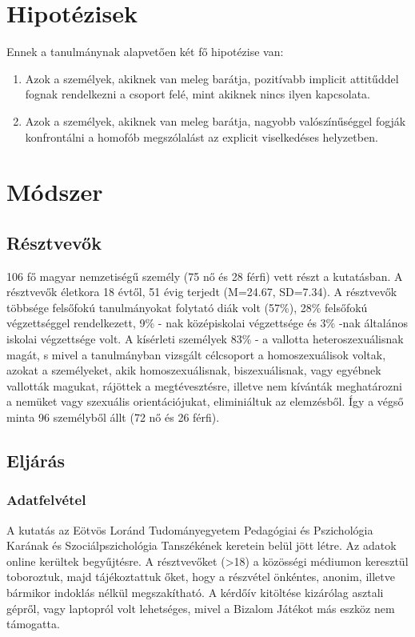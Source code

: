 \pagebreak
\section{Hipotézisek}
Ennek a tanulmánynak alapvetően két fő hipotézise van:
\begin{enumerate}
	\item Azok a személyek, akiknek van meleg barátja, pozitívabb implicit attitűddel fognak rendelkezni a csoport felé, mint akiknek nincs ilyen kapcsolata.
	\item Azok a személyek, akiknek van meleg barátja, nagyobb valószínűséggel fogják konfrontálni a homofób megszólalást az explicit viselkedéses helyzetben.
\end{enumerate}


\section{Módszer}
\subsection{Résztvevők}
106 fő magyar nemzetiségű személy (75 nő és 28 férfi) vett részt a kutatásban. A résztvevők életkora 18 évtől, 51 évig terjedt (M=24.67, SD=7.34). A résztvevők többsége felsőfokú tanulmányokat folytató diák volt (57\%), 28\% felsőfokú végzettséggel rendelkezett, 9\% - nak középiskolai végzettsége és 3\% -nak általános iskolai végzettsége volt. A kísérleti személyek 83\% - a vallotta heteroszexuálisnak magát, s mivel a tanulmányban vizsgált célcsoport a homoszexuálisok voltak, azokat a személyeket, akik homoszexuálisnak, biszexuálisnak, vagy egyébnek vallották magukat, rájöttek a megtévesztésre, illetve nem kívánták meghatározni a nemüket vagy szexuális orientációjukat, eliminiáltuk az elemzésből. Így a végső minta 96 személyből állt (72 nő és 26 férfi). 
\subsection{Eljárás}
\subsubsection{Adatfelvétel}
A kutatás az Eötvös Loránd Tudományegyetem Pedagógiai és Pszichológia Karának és Szociálpszichológia Tanszékének keretein belül jött létre. Az adatok online kerültek begyűjtésre. A résztvevőket (\textgreater 18) a közösségi médiumon keresztül toboroztuk, majd tájékoztattuk őket, hogy a részvétel önkéntes, anonim, illetve bármikor  indoklás nélkül megszakítható. A kérdőív kitöltése kizárólag asztali gépről, vagy laptopról volt lehetséges, mivel a Bizalom Játékot más eszköz nem támogatta. 
